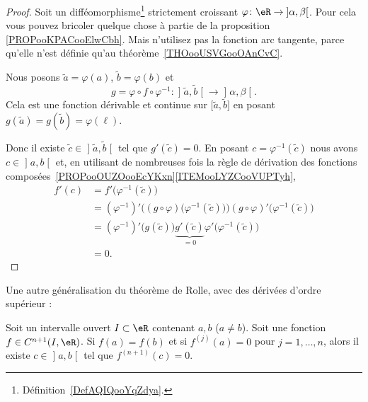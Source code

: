 \begin{proof}
	Soit un difféomorphisme\footnote{Définition~\ref{DefAQIQooYqZdya}.} strictement croissant \( \varphi\colon \eR\to \mathopen] \alpha , \beta \mathclose[\). Pour cela vous pouvez bricoler quelque chose à partie de la proposition \ref{PROPooKPACooElwCbh}.
		Mais n'utilisez pas la fonction arc tangente, parce qu'elle n'est définie qu'au théorème~\ref{THOooUSVGooOAnCvC}.

		Nous posons \( \tilde a=\varphi(a)\), \( \tilde b=\varphi(b)\) et
		\begin{equation}
			g= \varphi\circ f\circ \varphi^{-1}\colon \mathopen] \tilde  a , \tilde b \mathclose[\to \mathopen] \alpha , \beta \mathclose[.
		\end{equation}
		Cela est une fonction dérivable et continue sur \( \mathopen[ \tilde a , \tilde  b \mathclose]\) en posant \( g(\tilde a)=g(\tilde b)=\varphi(\ell)\).

		Donc il existe \( \tilde c\in\mathopen] \tilde a , \tilde b \mathclose[\) tel que \( g'(\tilde c)=0\). En posant \( c=\varphi^{-1}(\tilde c)\) nous avons \( c\in \mathopen] a , b \mathclose[\) et, en utilisant de nombreuses fois la règle de dérivation des fonctions composées~\ref{PROPooOUZOooEcYKxn}\ref{ITEMooLYZCooVUPTyh},
	\begin{subequations}
		\begin{align}
			f'(c) & =f'\big( \varphi^{-1}(\tilde c) \big)                                                                                            \\
			      & =(\varphi^{-1})'\Big( (g\circ \varphi)\big( \varphi^{-1}(\tilde c) \big) \Big)(g\circ\varphi)'\big( \varphi^{-1}(\tilde c) \big) \\
			      & =(\varphi^{-1})'\big( g(\tilde c) \big)\underbrace{g'(\tilde c)}_{=0}\varphi'\big( \varphi^{-1}(\tilde c) \big)                  \\
			      & =0.
		\end{align}
	\end{subequations}
\end{proof}

Une autre généralisation du théorème de Rolle, avec des dérivées d'ordre supérieur :
\begin{proposition}      \label{PROPooCPCAooJjOZNy}
	Soit un intervalle ouvert \( I\subset \eR\) contenant \( a,b\) (\( a\neq b\)). Soit une fonction \( f\in C^{n+1}(I,\eR)\). Si \( f(a)=f(b)\) et si \( f^{(j)}(a)=0\) pour \( j=1,\ldots, n\), alors il existe \( c\in \mathopen] a , b \mathclose[\) tel que \( f^{(n+1)}(c)=0\).
\end{proposition}

